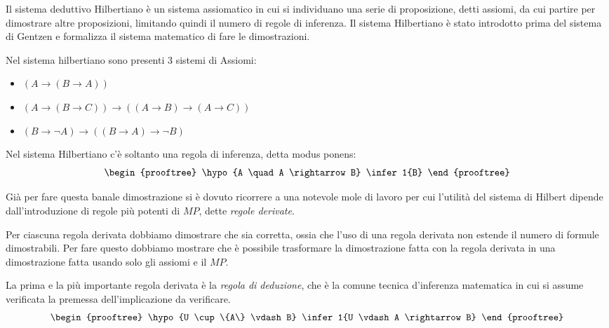 Il sistema deduttivo Hilbertiano è un sistema assiomatico in cui si individuano
una serie di proposizione, detti assiomi, da cui partire per dimostrare altre proposizioni,
limitando quindi il numero di regole di inferenza.\newline
Il sistema Hilbertiano è stato introdotto prima del sistema di Gentzen e formalizza
il sistema matematico di fare le dimostrazioni.

Nel sistema hilbertiano sono presenti 3 sistemi di Assiomi:
\begin{itemize}
    \item $(A \rightarrow (B \rightarrow A))$
    \item $(A \rightarrow (B \rightarrow C)) \rightarrow ((A \rightarrow B) \rightarrow (A \rightarrow C))$
    \item $(B \rightarrow \neg A) \rightarrow ((B \rightarrow A) \rightarrow \neg B)$
\end{itemize}
Nel sistema Hilbertiano c'è soltanto una regola di inferenza, detta modus ponens:
\begin{equation*}
\begin{prooftree}
\hypo{A \quad A \rightarrow B}
\infer1{B}
\end{prooftree}
\end{equation*}



Già per fare questa banale dimostrazione si è dovuto ricorrere a una notevole mole
di lavoro per cui l'utilità del sistema di Hilbert dipende dall'introduzione di
regole più potenti di $MP$, dette \emph{regole derivate}.

Per ciascuna regola derivata dobbiamo dimostrare che sia corretta, ossia che l'uso di
una regola derivata non estende il numero di formule dimostrabili.
Per fare questo dobbiamo mostrare che è possibile trasformare la dimostrazione fatta
con la regola derivata in una dimostrazione fatta usando solo gli assiomi e il $MP$.

La prima e la più importante regola derivata è la \emph{regola di deduzione},
che è la comune tecnica d'inferenza matematica in cui si assume verificata la premessa
dell'implicazione da verificare.
\begin{equation*}
\begin{prooftree}
\hypo{U \cup \{A\} \vdash B}
\infer1{U \vdash A \rightarrow B}
\end{prooftree}
\end{equation*}

